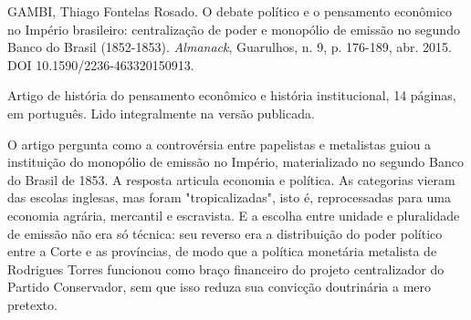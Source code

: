
\begin{identificacao}
GAMBI, Thiago Fontelas Rosado. O debate político e o pensamento econômico no
Império brasileiro: centralização de poder e monopólio de emissão no segundo
Banco do Brasil (1852-1853). \emph{Almanack}, Guarulhos, n. 9, p. 176-189,
abr. 2015. DOI 10.1590/2236-463320150913.

Artigo de história do pensamento econômico e história institucional, 14
páginas, em português. Lido integralmente na versão publicada.
\end{identificacao}

O artigo pergunta como a controvérsia entre papelistas e metalistas guiou a
instituição do monopólio de emissão no Império, materializado no segundo Banco
do Brasil de 1853. A resposta articula economia e política. As categorias
vieram das escolas inglesas, mas foram "tropicalizadas", isto é, reprocessadas
para uma economia agrária, mercantil e escravista. E a escolha entre unidade e
pluralidade de emissão não era só técnica: seu reverso era a distribuição do
poder político entre a Corte e as províncias, de modo que a política monetária
metalista de Rodrigues Torres funcionou como braço financeiro do projeto
centralizador do Partido Conservador, sem que isso reduza sua convicção
doutrinária a mero pretexto.

